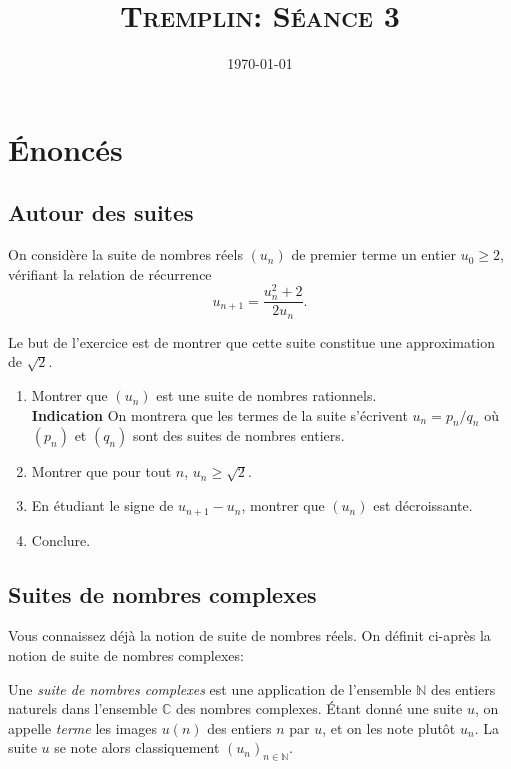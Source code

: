 \documentclass[12pt]{article}
\title{\textsc{Tremplin: Séance 3}}
\date{\today}
\author{}
\newcommand{\CC}{\mathbb C}
\newcommand{\NN}{\mathbb N}
\theoremstyle{definition}
\begin{document}
\maketitle

\section*{Énoncés}

\subsection*{Autour des suites}

\begin{exer}
	On considère la suite de nombres réels $(u_n)$ de premier terme un entier $u_0\geq 2$, vérifiant la relation de récurrence \[
	u_{n+1} = \frac{u_n^2+2}{2u_n}.
	\]
	
	Le but de l'exercice est de montrer que cette suite constitue une approximation de $\sqrt{2}$.
	\begin{enumerate}
		\item Montrer que $(u_n)$ est une suite de nombres rationnels.\\
		\textbf{Indication} On montrera que les termes de la suite s'écrivent $u_n = p_n/q_n$ où $(p_n)$ et $(q_n)$ sont des suites de nombres entiers.
		\item Montrer que pour tout $n$, $u_n \geq \sqrt 2$.
		\item En étudiant le signe de $u_{n+1} - u_n$, montrer que $(u_n)$ est décroissante.
		\item Conclure.
	\end{enumerate}
\end{exer}

\subsection*{Suites de nombres complexes}

Vous connaissez déjà la notion de suite de nombres réels. On définit ci-après la notion de suite de nombres complexes:
\begin{defn}
Une \textit{suite de nombres complexes} est une application de l'ensemble $\NN$ des entiers naturels dans l'ensemble $\CC$ des nombres complexes. Étant donné une suite $u$, on appelle \textit{terme} les images $u(n)$ des entiers $n$ par $u$, et on les note plutôt $u_n$. La suite $u$ se note alors classiquement $(u_n)_{n\in\NN}$.
\end{defn}
\end{document}

